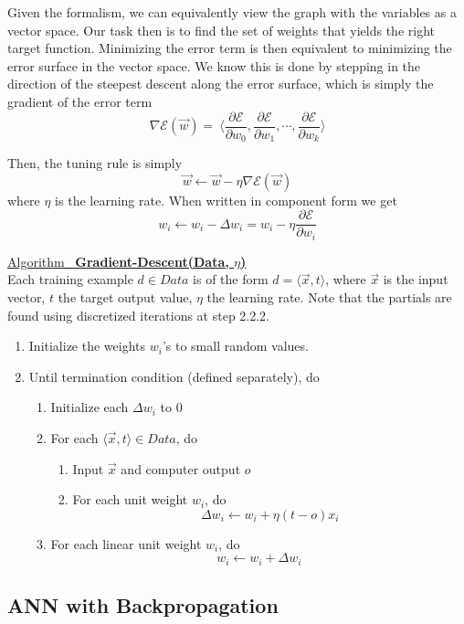 \documentclass[12pt]{article}  %
\newcommand{\algtitle}[1]{\underline{Algorithm \ {\bf #1}} \vspace*{1mm}\\}
\begin{document}
Given the formalism, we can equivalently view the graph with the variables as a vector space. Our task then is to find the set of weights that yields the right target function. Minimizing the error term is then equivalent to minimizing the error surface in the vector space. We know this is done by stepping in the direction of the steepest descent along the error surface, which is simply the gradient of the error term $$\nabla \mathcal{E}(\vec{w}) =\ \langle  \frac{\partial \mathcal{E}}{\partial w_0}, \frac{\partial \mathcal{E}}{\partial w_1}, \cdots, \frac{\partial \mathcal{E}}{\partial w_k}  \rangle$$

Then, the tuning rule is simply $$\vec{w} \leftarrow \vec{w} - \eta \nabla \mathcal{E}(\vec{w})$$ where $\eta$ is the learning rate. When written in component form we get $$w_i \leftarrow w_i - \Delta w_i = w_i - \eta \frac{\partial \mathcal{E}}{\partial w_i}$$


\algtitle{Gradient-Descent(Data, $\eta$)}
Each training example $d \in Data$ is of the form $d = \langle \vec{x}, t \rangle$, where $\vec{x}$ is the input vector, $t$ the target output value, $\eta$ the learning rate. Note that the partials are found using discretized iterations at step 2.2.2.

\begin{enumerate}
	\item Initialize the weights $w_i$'s to small random values.
	\item Until termination condition (defined separately), do
		\begin{enumerate}
			\item Initialize each $\Delta w_i$ to 0
			\item For each $\langle \vec{x}, t \rangle \in Data$, do 
			\begin{enumerate}
				\item Input $\vec{x}$ and computer output $o$
				\item For each unit weight $w_i$, do $$\Delta w_i \leftarrow w_i + \eta(t-o)x_i$$
			\end{enumerate}
			\item For each linear unit weight $w_i$, do $$w_i \leftarrow w_i + \Delta w_i$$
		\end{enumerate}
\end{enumerate}





\subsection{ANN with Backpropagation}
\end{document}
